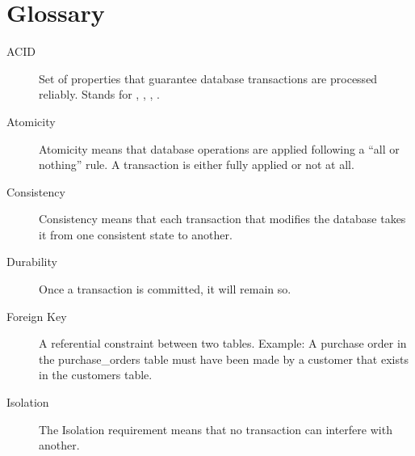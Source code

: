 \documentclass[letterpaper,10pt,english]{sphinxmanual}
\begin{document}
\chapter{Glossary}
\label{\detokenize{glossary:glossary}}\label{\detokenize{glossary::doc}}\begin{description}
\item[{ACID\label{\detokenize{glossary:term-ACID}}}] \leavevmode
\sphinxAtStartPar
Set of properties that guarantee database transactions are
processed reliably. Stands for {\hyperref[\detokenize{glossary:term-Atomicity}]{}},
{\hyperref[\detokenize{glossary:term-Consistency}]{}}, {\hyperref[\detokenize{glossary:term-Isolation}]{}}, {\hyperref[\detokenize{glossary:term-Durability}]{}}.

\item[{Atomicity\label{\detokenize{glossary:term-Atomicity}}}] \leavevmode
\sphinxAtStartPar
Atomicity means that database operations are applied following a
“all or nothing” rule. A transaction is either fully applied or not
at all.

\item[{Consistency\label{\detokenize{glossary:term-Consistency}}}] \leavevmode
\sphinxAtStartPar
Consistency means that each transaction that modifies the database
takes it from one consistent state to another.

\item[{Durability\label{\detokenize{glossary:term-Durability}}}] \leavevmode
\sphinxAtStartPar
Once a transaction is committed, it will remain so.

\item[{Foreign Key\label{\detokenize{glossary:term-Foreign-Key}}}] \leavevmode
\sphinxAtStartPar
A referential constraint between two tables. Example: A purchase
order in the purchase\_orders table must have been made by a customer
that exists in the customers table.

\item[{Isolation\label{\detokenize{glossary:term-Isolation}}}] \leavevmode
\sphinxAtStartPar
The Isolation requirement means that no transaction can interfere
with another.


\end{description}
\end{document}
